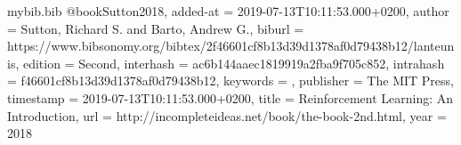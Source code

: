 \begin{filecontents*}{mybib.bib}
@book{Sutton2018,
  added-at = {2019-07-13T10:11:53.000+0200},
  author = {Sutton, Richard S. and Barto, Andrew G.},
  biburl = {https://www.bibsonomy.org/bibtex/2f46601cf8b13d39d1378af0d79438b12/lanteunis},
  edition = {Second},
  interhash = {ac6b144aaec1819919a2fba9f705c852},
  intrahash = {f46601cf8b13d39d1378af0d79438b12},
  keywords = {},
  publisher = {The MIT Press},
  timestamp = {2019-07-13T10:11:53.000+0200},
  title = {Reinforcement Learning: An Introduction},
  url = {http://incompleteideas.net/book/the-book-2nd.html},
  year = {2018 }
}
\end{filecontents*}

\documentclass[10pt,a4paper]{article}
\usepackage[utf8]{inputenc}
\usepackage[top=1.25in, bottom=1.25in, left=.75in, right=.75in]{geometry}
\usepackage{amsmath}
\usepackage{algorithmicx}
\usepackage{algpseudocode}
\usepackage{algorithm2e}
\usepackage{amsfonts}
\usepackage{mathtools}
\usepackage{amssymb}
\usepackage{xcolor}
\usepackage{natbib}
\usepackage{bibentry}
\usepackage{fancyhdr}
\usepackage{dsfont}
\renewcommand{\familydefault}{\sfdefault}
\pagestyle{fancy}
\nobibliography*
\DeclareMathOperator*{\argmax}{arg\,max}
\author{Johannes Ender}

\clearpage
\setcounter{section}{2}
\section{Dynamic Programming}
\subsection*{22. Exercise 4.1 In Example 4.1, if $\pi$ is the equiprobable random policy, what is $q_\pi$(11, down)?}
As the terminal state's action value is 0, $q_\pi$(11, down) can be calculated as:
\begin{align*}
q_\pi(11, down) &= p(s', r \mid s, a)[r] \\
&= 1 \cdot [-1] = -1
\end{align*}

